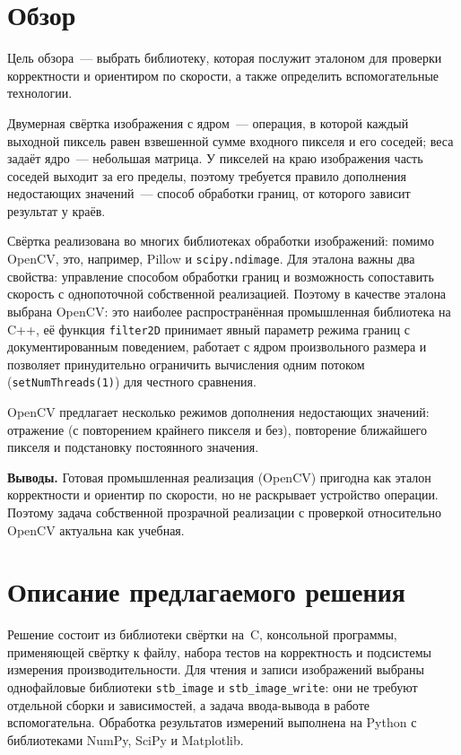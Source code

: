 \documentclass[a4paper]{article}
\begin{document}
\section{Обзор}

Цель обзора~--- выбрать библиотеку, которая послужит эталоном для проверки корректности и ориентиром по скорости, а также определить вспомогательные технологии.

Двумерная свёртка изображения с ядром~--- операция, в которой каждый выходной пиксель равен взвешенной сумме входного пикселя и его соседей; веса задаёт ядро~--- небольшая матрица. У пикселей на краю изображения часть соседей выходит за его пределы, поэтому требуется правило дополнения недостающих значений~--- способ обработки границ, от которого зависит результат у краёв. 

Свёртка реализована во многих библиотеках обработки изображений: помимо OpenCV, это, например, Pillow и \texttt{scipy.ndimage}. Для эталона важны два свойства: управление способом обработки границ и возможность сопоставить скорость с однопоточной собственной реализацией. Поэтому в качестве эталона выбрана OpenCV: это наиболее распространённая промышленная библиотека на C++, её функция \texttt{filter2D} принимает явный параметр режима границ с документированным поведением, работает с ядром произвольного размера и позволяет принудительно ограничить вычисления одним потоком (\texttt{setNumThreads(1)}) для честного сравнения.

OpenCV предлагает несколько режимов дополнения недостающих значений: отражение (с повторением крайнего пикселя и без), повторение ближайшего пикселя и подстановку постоянного значения. 

\textbf{Выводы.} Готовая промышленная реализация (OpenCV) пригодна как эталон корректности и ориентир по скорости, но не раскрывает устройство операции. Поэтому задача собственной прозрачной реализации с проверкой относительно OpenCV актуальна как учебная.

\section{Описание предлагаемого решения}

Решение состоит из библиотеки свёртки на~C, консольной программы, применяющей свёртку к файлу, набора тестов на корректность и подсистемы измерения производительности. Для чтения и записи изображений выбраны однофайловые библиотеки \texttt{stb\_image} и \texttt{stb\_image\_write}: они не требуют отдельной сборки и зависимостей, а задача ввода-вывода в работе вспомогательна. Обработка результатов измерений выполнена на Python с библиотеками NumPy, SciPy и Matplotlib.
\end{document}
